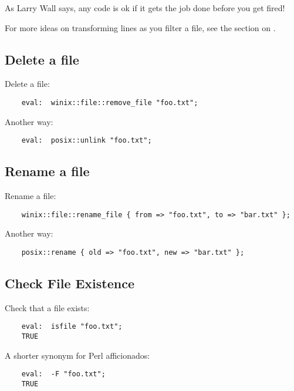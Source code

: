 As Larry Wall says, any code is ok if it gets the job done before you get fired!

For more ideas on transforming lines as you filter a file, see the section on 
.
\cutend*

\subsection{Delete a file}

Delete a file:
\begin{verbatim}
    eval:  winix::file::remove_file "foo.txt";
\end{verbatim}

Another way:
\begin{verbatim}
    eval:  posix::unlink "foo.txt";
\end{verbatim}

\cutend*

\subsection{Rename a file}

Rename a file:
\begin{verbatim}
    winix::file::rename_file { from => "foo.txt", to => "bar.txt" };
\end{verbatim}

Another way:
\begin{verbatim}
    posix::rename { old => "foo.txt", new => "bar.txt" };
\end{verbatim}

\cutend*

\subsection{Check File Existence}

Check that a file exists:
\begin{verbatim}
    eval:  isfile "foo.txt";
    TRUE
\end{verbatim}

A shorter synonym for Perl afficionados:
\begin{verbatim}
    eval:  -F "foo.txt";
    TRUE
\end{verbatim}

